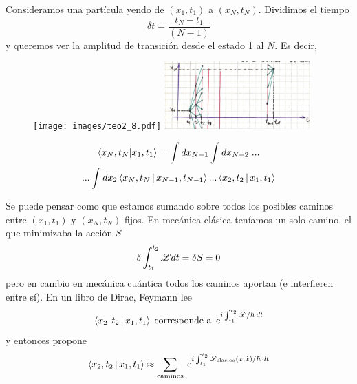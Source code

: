\documentclass[10pt,oneside]{CBFT_book}
\begin{document}
Consideramos una partícula yendo de $(x_1,t_1)$ a $(x_N,t_N)$. Dividimos el tiempo 
\[
	\delta t = \frac{t_N-t_1}{(N-1)}
\]
y queremos ver la amplitud de transición desde el estado 1 al $N$. Es decir,
\begin{figure}[htb]
	\begin{center}
	\texttt{[image: images/teo2\_8.pdf]} 
	\includegraphics[width=0.5\textwidth]{images/fig_ft2_feynmann_path_int.jpg}
	\end{center}
	\caption{}
\end{figure} 
\begin{multline*}
	\braket{x_N,t_N|x_1,t_1} = \int dx_{N-1}\int dx_{N-2} \; ... \\
	... \int dx_2 \Braket{x_N,t_N|x_{N-1},t_{N-1}} ...\Braket{x_2,t_2|x_1,t_1}
\end{multline*}

Se puede pensar como que estamos sumando sobre todos los posibles caminos entre 
$(x_1,t_1)$ y $(x_N,t_N)$ fijos. 
En mecánica clásica teníamos un solo camino, el que minimizaba la acción $S$
\[
	\delta \int_{t_1}^{t_2} \mathscr{L} dt = \delta S = 0
\]
pero en cambio en mecánica cuántica todos los caminos aportan (e interfieren entre sí). 
En un libro de Dirac, Feymann lee 
\[
	\Braket{x_2,t_2|x_1,t_1} \; \text{corresponde a} \; \:\mathrm{e}^{i\int_{t_1}^{t_2}\mathscr{L}/\hbar \: dt}
\]
y entonces propone
\[
	\Braket{x_2,t_2|x_1,t_1} \approx \sum_{\text{caminos}} 
	\:\mathrm{e}^{ i\int_{t_1}^{t_2} \mathscr{L}_{\text{clasico}}(x,\dot{x}) /\hbar \: dt}
\]
\end{document}
